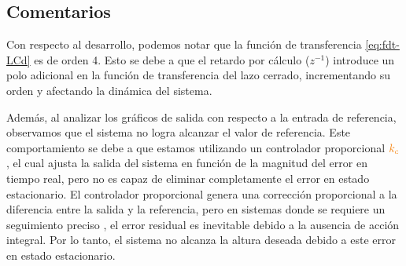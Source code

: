 \FloatBarrier

\subsection{Comentarios}


Con respecto al desarrollo, podemos notar que la función de transferencia
\eqref{eq:fdt-LCd} es de orden 4. Esto se debe a que el retardo por cálculo
($z^{-1}$) introduce un polo adicional en la función de transferencia del lazo
cerrado, incrementando su orden y afectando la dinámica del sistema.

Además, al analizar los gráficos de salida con respecto a la entrada de referencia,
observamos que el sistema no logra alcanzar el valor de referencia. Este
comportamiento se debe a que estamos utilizando un controlador proporcional
$\nara{k_c}$, el cual ajusta la salida del sistema en función de la magnitud del
error en tiempo real, pero no es capaz de eliminar completamente el error en estado
estacionario. El controlador proporcional genera una corrección proporcional a la
diferencia entre la salida y la referencia, pero en sistemas donde se requiere un
seguimiento preciso , el error residual es inevitable debido a la ausencia de
acción integral. Por lo tanto, el sistema no alcanza la altura deseada debido a
este error en estado estacionario.


